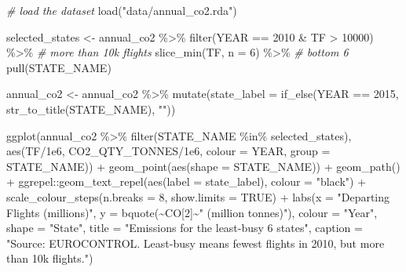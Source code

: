 \documentclass[
]{book}
\newenvironment{Shaded}{\begin{snugshade}}{\end{snugshade}}
\newcommand{\AttributeTok}[1]{\textcolor[rgb]{0.77,0.63,0.00}{#1}}
\newcommand{\CommentTok}[1]{\textcolor[rgb]{0.56,0.35,0.01}{\textit{#1}}}
\newcommand{\ConstantTok}[1]{\textcolor[rgb]{0.00,0.00,0.00}{#1}}
\newcommand{\DecValTok}[1]{\textcolor[rgb]{0.00,0.00,0.81}{#1}}
\newcommand{\FloatTok}[1]{\textcolor[rgb]{0.00,0.00,0.81}{#1}}
\newcommand{\FunctionTok}[1]{\textcolor[rgb]{0.00,0.00,0.00}{#1}}
\newcommand{\NormalTok}[1]{#1}
\newcommand{\OtherTok}[1]{\textcolor[rgb]{0.56,0.35,0.01}{#1}}
\newcommand{\SpecialCharTok}[1]{\textcolor[rgb]{0.00,0.00,0.00}{#1}}
\newcommand{\StringTok}[1]{\textcolor[rgb]{0.31,0.60,0.02}{#1}}
\begin{document}
\begin{Shaded}
\begin{Highlighting}[]
\CommentTok{\# load the dataset}
\FunctionTok{load}\NormalTok{(}\StringTok{"data/annual\_co2.rda"}\NormalTok{)}

\NormalTok{selected\_states }\OtherTok{\textless{}{-}}\NormalTok{ annual\_co2 }\SpecialCharTok{\%\textgreater{}\%}
  \FunctionTok{filter}\NormalTok{(YEAR }\SpecialCharTok{==} \DecValTok{2010} \SpecialCharTok{\&}\NormalTok{ TF }\SpecialCharTok{\textgreater{}} \DecValTok{10000}\NormalTok{) }\SpecialCharTok{\%\textgreater{}\%}     \CommentTok{\# more than 10k flights}
  \FunctionTok{slice\_min}\NormalTok{(TF, }\AttributeTok{n =} \DecValTok{6}\NormalTok{) }\SpecialCharTok{\%\textgreater{}\%}  \CommentTok{\# bottom 6 }
  \FunctionTok{pull}\NormalTok{(STATE\_NAME) }

\NormalTok{annual\_co2 }\OtherTok{\textless{}{-}}\NormalTok{ annual\_co2 }\SpecialCharTok{\%\textgreater{}\%} 
  \FunctionTok{mutate}\NormalTok{(}\AttributeTok{state\_label =} \FunctionTok{if\_else}\NormalTok{(YEAR }\SpecialCharTok{==} \DecValTok{2015}\NormalTok{, }\FunctionTok{str\_to\_title}\NormalTok{(STATE\_NAME), }\StringTok{""}\NormalTok{))}

\FunctionTok{ggplot}\NormalTok{(annual\_co2 }\SpecialCharTok{\%\textgreater{}\%} 
         \FunctionTok{filter}\NormalTok{(STATE\_NAME }\SpecialCharTok{\%in\%}\NormalTok{ selected\_states), }
       \FunctionTok{aes}\NormalTok{(TF}\SpecialCharTok{/}\FloatTok{1e6}\NormalTok{, CO2\_QTY\_TONNES}\SpecialCharTok{/}\FloatTok{1e6}\NormalTok{, }
           \AttributeTok{colour =}\NormalTok{ YEAR, }\AttributeTok{group =}\NormalTok{ STATE\_NAME)) }\SpecialCharTok{+}
  \FunctionTok{geom\_point}\NormalTok{(}\FunctionTok{aes}\NormalTok{(}\AttributeTok{shape =}\NormalTok{ STATE\_NAME)) }\SpecialCharTok{+} 
  \FunctionTok{geom\_path}\NormalTok{() }\SpecialCharTok{+}
\NormalTok{  ggrepel}\SpecialCharTok{::}\FunctionTok{geom\_text\_repel}\NormalTok{(}\FunctionTok{aes}\NormalTok{(}\AttributeTok{label =}\NormalTok{ state\_label), }\AttributeTok{colour =} \StringTok{"black"}\NormalTok{) }\SpecialCharTok{+}
  \FunctionTok{scale\_colour\_steps}\NormalTok{(}\AttributeTok{n.breaks =} \DecValTok{8}\NormalTok{, }\AttributeTok{show.limits =} \ConstantTok{TRUE}\NormalTok{) }\SpecialCharTok{+}
  \FunctionTok{labs}\NormalTok{(}\AttributeTok{x =} \StringTok{"Departing Flights (millions)"}\NormalTok{, }
       \AttributeTok{y =} \FunctionTok{bquote}\NormalTok{(}\SpecialCharTok{\textasciitilde{}}\NormalTok{CO[}\DecValTok{2}\NormalTok{]}\SpecialCharTok{\textasciitilde{}}\StringTok{" (million tonnes)"}\NormalTok{),}
       \AttributeTok{colour =} \StringTok{"Year"}\NormalTok{,}
       \AttributeTok{shape =} \StringTok{"State"}\NormalTok{,}
       \AttributeTok{title =} \StringTok{"Emissions for the least{-}busy 6 states"}\NormalTok{,}
       \AttributeTok{caption =} \StringTok{"Source: EUROCONTROL. \textquotesingle{}Least{-}busy\textquotesingle{} means fewest flights in 2010, but more than 10k flights."}\NormalTok{)}
\end{Highlighting}
\end{Shaded}
\end{document}

